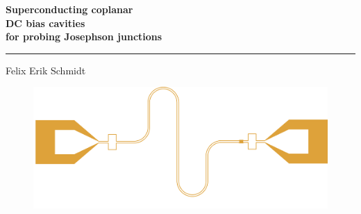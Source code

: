 \documentclass{dissertation-edit}
\begin{document}
{\linespread{1.1}\raggedright\bfseries\Huge Superconducting coplanar \\DC bias cavities\\ for probing Josephson junctions\par
\vspace{0.5cm}
\hrule height 2pt
\vspace{0.5cm}
\normalfont\LARGE Felix Erik Schmidt	
}
\begin{figure}[b]
	\includegraphics[width=\linewidth]{../title/cover_circuit/nazca_export_post.pdf}
\end{figure}


\end{document}
